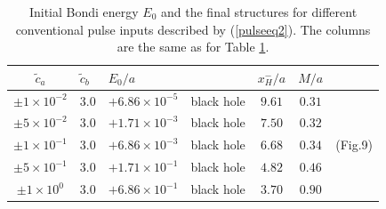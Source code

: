 \begin{table}[tb]
\begin{tabular}{c|l|l|lccl}
\hline
  $\tilde{c}_a$ &  $\tilde{c}_b$ &   $E_0/a$  & %
  &$x^-_H/a$ &$M/a$ &
\\
\hline $\pm 1\times10^{-2}$  & 3.0 &  $+ 6.86 \times 10^{-5}$ & black hole &
$9.61$ & $0.31 $ &
\\
$\pm 5\times10^{-2}$  & 3.0 &  $+ 1.71 \times 10^{-3}$ & black hole & $ 7.50 $
& $0.32 $ &
\\
$\pm 1\times10^{-1}$ & 3.0 &  $+ 6.86 \times 10^{-3}$ & black hole & $6.68$ &
$0.34 $  & (Fig.9)
\\
$\pm 5\times10^{-1}$  & 3.0 &  $+ 1.71 \times 10^{-1}$ & black hole & $ 4.82 $
& $ 0.46 $ &
\\
$\pm 1\times10^{0}$  & 3.0 &  $+ 6.86 \times 10^{-1}$ & black hole & $3.70$ &
$0.90 $  &
\\
\hline
\end{tabular}
\caption{Initial Bondi energy $E_0$ and the final structures for different
conventional pulse inputs described by (\ref{pulseeq2}). The columns are the
same as for Table \ref{table2}. }\label{table2}
\end{table}
